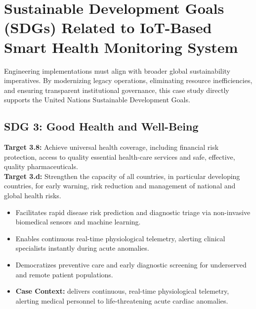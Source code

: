 \section{Sustainable Development Goals (SDGs) Related to IoT-Based Smart Health Monitoring System}
Engineering implementations must align with broader global sustainability imperatives. By modernizing legacy operations, eliminating resource inefficiencies, and ensuring transparent institutional governance, this case study directly supports the United Nations Sustainable Development Goals.

\subsection{SDG 3: Good Health and Well-Being}
\noindent\textbf{Target 3.8:} Achieve universal health coverage, including financial risk protection, access to quality essential health-care services and safe, effective, quality pharmaceuticals. \\
\noindent\textbf{Target 3.d:} Strengthen the capacity of all countries, in particular developing countries, for early warning, risk reduction and management of national and global health risks.
\begin{itemize}
  \item Facilitates rapid disease risk prediction and diagnostic triage via non-invasive biomedical sensors and machine learning.
  \item Enables continuous real-time physiological telemetry, alerting clinical specialists instantly during acute anomalies.
  \item Democratizes preventive care and early diagnostic screening for underserved and remote patient populations.
  \item \textbf{Case Context:} delivers continuous, real-time physiological telemetry, alerting medical personnel to life-threatening acute cardiac anomalies.
\end{itemize}

